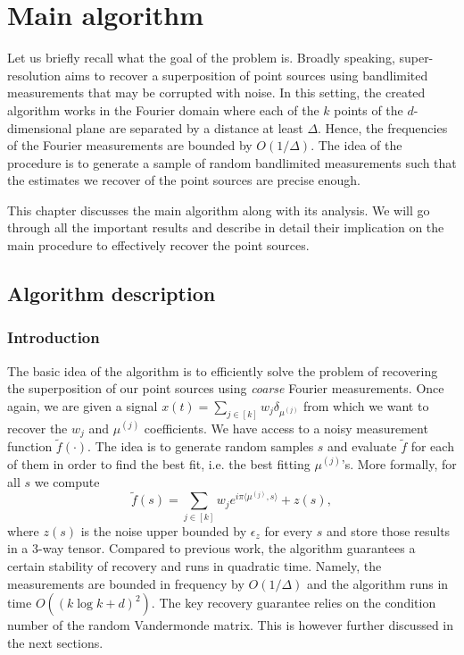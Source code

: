 \chapter{Main algorithm}
Let us briefly recall what the goal of the problem is. Broadly speaking, super-resolution aims to recover a superposition of point sources using bandlimited measurements that may be corrupted with noise. In this setting, the created algorithm works in the Fourier domain where each of the $k$ points of the $d$-dimensional plane are separated by a distance at least $\Delta$. Hence, the frequencies of the Fourier measurements are bounded by $O(1/\Delta)$. The idea of the procedure is to generate a sample of random bandlimited measurements such that the estimates we recover of the point sources are precise enough.\par 
This chapter discusses the main algorithm along with its analysis. We will go through all the important results and describe in detail their implication on the main procedure to effectively recover the point sources.

\section{Algorithm description}
\subsection{Introduction}
The basic idea of the algorithm is to efficiently solve the problem of recovering the superposition of our point sources using \textit{coarse} Fourier measurements. Once again, we are given a signal $x(t)=\sum_{j\in[k]}w_j\delta_{\mu^{(j)}}$ from which we want to recover the $w_j$ and $\mu^{(j)}$ coefficients. We have access to a noisy measurement function $\widetilde{f}(\cdot)$. The idea is to generate random samples $s$ and evaluate $\widetilde{f}$ for each of them in order to find the best fit, i.e. the best fitting $\mu^{(j)}$'s. More formally, for all $s$ we compute $$\widetilde{f}(s)=\sum_{j\in[k]}w_je^{i\pi\langle\mu^{(j)},s\rangle}+z(s),$$ where $z(s)$ is the noise upper bounded by $\epsilon_z$ for every $s$ and store those results in a 3-way tensor. Compared to previous work, the algorithm guarantees a certain stability of recovery and runs in quadratic time. Namely, the measurements are bounded in frequency by $O(1/\Delta)$ and the algorithm runs in time $O((k\log k+d)^2)$. The key recovery guarantee relies on the condition number of the random Vandermonde matrix. This is however further discussed in the next sections.

